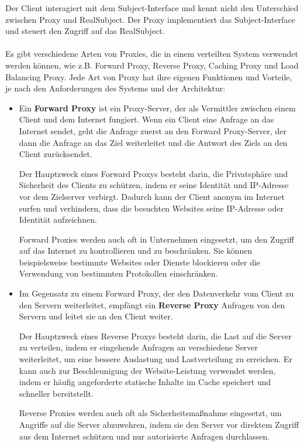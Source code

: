 \documentclass[../vs-script-first-v01.tex]{subfiles}
\begin{document}
Der Client interagiert mit dem Subject-Interface und kennt nicht den Unterschied zwischen Proxy und RealSubject. Der Proxy implementiert das Subject-Interface und steuert den Zugriff auf das RealSubject.
\\\\
Es gibt verschiedene Arten von Proxies, die in einem verteilten System verwendet werden können, wie z.B. Forward Proxy, Reverse Proxy, Caching Proxy und Load Balancing Proxy. Jede Art von Proxy hat ihre eigenen Funktionen und Vorteile, je nach den Anforderungen des Systems und der Architektur:

\begin{itemize}
\item Ein \textbf{Forward Proxy} ist ein Proxy-Server, der als Vermittler zwischen einem Client und dem Internet fungiert. Wenn ein Client eine Anfrage an das Internet sendet, geht die Anfrage zuerst an den Forward Proxy-Server, der dann die Anfrage an das Ziel weiterleitet und die Antwort des Ziels an den Client zurücksendet.

Der Hauptzweck eines Forward Proxys besteht darin, die Privatsphäre und Sicherheit des Clients zu schützen, indem er seine Identität und IP-Adresse vor dem Zielserver verbirgt. Dadurch kann der Client anonym im Internet surfen und verhindern, dass die besuchten Websites seine IP-Adresse oder Identität aufzeichnen.

Forward Proxies werden auch oft in Unternehmen eingesetzt, um den Zugriff auf das Internet zu kontrollieren und zu beschränken. Sie können beispielsweise bestimmte Websites oder Dienste blockieren oder die Verwendung von bestimmten Protokollen einschränken.
\item Im Gegensatz zu einem Forward Proxy, der den Datenverkehr vom Client zu den Servern weiterleitet, empfängt ein \textbf{Reverse Proxy} Anfragen von den Servern und leitet sie an den Client weiter.

Der Hauptzweck eines Reverse Proxys besteht darin, die Last auf die Server zu verteilen, indem er eingehende Anfragen an verschiedene Server weiterleitet, um eine bessere Auslastung und Lastverteilung zu erreichen. Er kann auch zur Beschleunigung der Website-Leistung verwendet werden, indem er häufig angeforderte statische Inhalte im Cache speichert und schneller bereitstellt.

Reverse Proxies werden auch oft als Sicherheitsmaßnahme eingesetzt, um Angriffe auf die Server abzuwehren, indem sie den Server vor direktem Zugriff aus dem Internet schützen und nur autorisierte Anfragen durchlassen.


\end{itemize}
\end{document}
